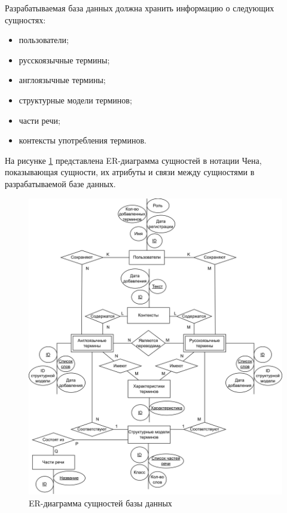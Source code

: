 Разрабатываемая база данных должна хранить информацию о следующих сущностях:

\begin{itemize}[label*=---]
	\item пользователи;
	\item русскоязычные термины;
	\item англоязычные термины;
	\item структурные модели терминов;
	\item части речи;
	\item контексты употребления терминов.
	
\end{itemize}

На рисунке \ref{fig:er} представлена ER-диаграмма сущностей в нотации Чена, показывающая сущности, их атрибуты и связи между сущностями в разрабатываемой базе данных.

\begin{figure}[h]
	\centering
	\includegraphics[width=\textwidth ]{img/ER/ER.drawio.png}
	\caption{ER-диаграмма сущностей базы данных}
	\label{fig:er}
\end{figure} 

